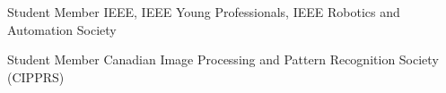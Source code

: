 

\begin{cventries}

  \cventry
    {Student Member} %
    {IEEE, IEEE Young Professionals, IEEE Robotics and Automation Society} %
    {} %
    {} %
    {}

  \cventry
    {Student Member} %
    {Canadian Image Processing and Pattern Recognition Society (CIPPRS)} %
    {} %
    {} %
    {}

\end{cventries}
